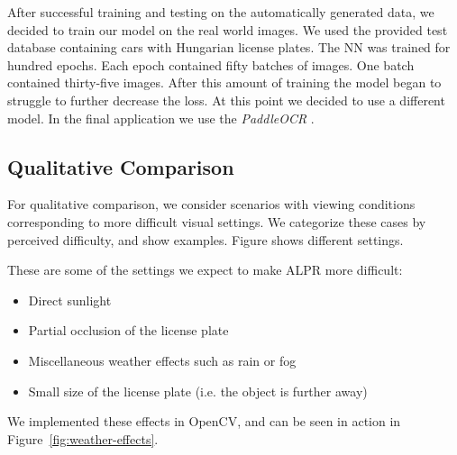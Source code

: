 After successful training and testing on the automatically generated data, we
decided to train our model on the real world images.  We used the provided test
database containing cars with Hungarian license plates.  The \ac{NN} was trained
for hundred epochs.  Each epoch contained fifty batches of images.  One batch
contained thirty-five images.  After this amount of training the model began to
struggle to further decrease the loss.  At this point we decided to use
a different model.  In the final application we use the \emph{PaddleOCR}
\cite{DBLP:journals/corr/abs-2009-09941}.

\subsection{Qualitative Comparison}
For qualitative comparison, we consider scenarios with viewing conditions
corresponding to more difficult visual settings. We categorize these cases by
perceived difficulty, and show examples. Figure  shows
different settings. 

These are some of the settings we expect to make \ac{ALPR} more
difficult:
\begin{itemize}
    \item Direct sunlight 
    \item Partial occlusion of the license plate 
    \item Miscellaneous weather effects such as rain or fog
    \item Small size of the license plate (i.e. the object is further away)
\end{itemize}

We implemented these effects in OpenCV, and can be seen in action in
Figure~\ref{fig:weather-effects}.
